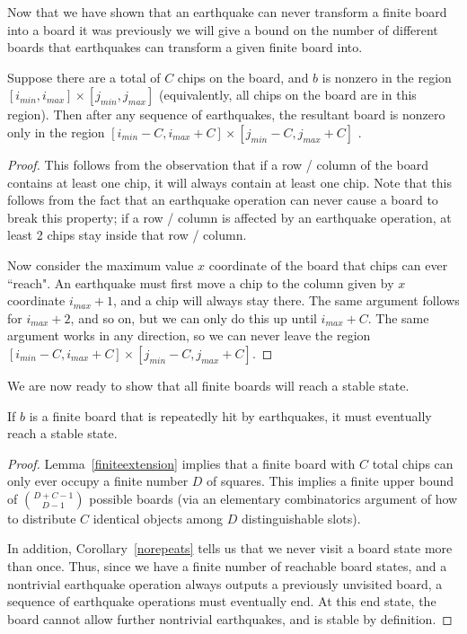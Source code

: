 \documentclass[runningheads,a4paper]{llncs}
\begin{document}
Now that we have shown that an earthquake can never transform a finite board into a board it was previously we will give a bound on the number of different boards that earthquakes can transform a given finite board into.
\begin{lemma}
\label{finiteextension}
Suppose there are a total of $C$ chips on the board, and $b$ is nonzero in the region $[i_{min}, i_{max}] \times [j_{min}, j_{max}]$ (equivalently, all chips on the board are in this region). Then after any sequence of earthquakes, the resultant board is nonzero only in the region $[i_{min}-C, i_{max}+C] \times [j_{min}-C, j_{max}+C]$ .
\end{lemma}

\begin{proof}
This follows from the observation that if a row / column of the board contains at least one chip, it will always contain at least one chip. Note that this follows from the fact that an earthquake operation can never cause a board to break this property; if a row / column is affected by an earthquake operation, at least 2 chips stay inside that row / column.

Now consider the maximum value $x$ coordinate of the board that chips can ever ``reach". An earthquake must first move a chip to the column given by $x$ coordinate $i_{max} +1$, and a chip will always stay there. The same argument follows for $i_{max} + 2$, and so on, but we can only do this up until $i_{max} +C$. The same argument works in any direction, so we can never leave the region $[i_{min}-C, i_{max}+C] \times [j_{min}-C, j_{max}+C]$.
\end{proof}

We are now ready to show that all finite boards will reach a stable state. 

\begin{theorem} If $b$ is a finite board that is repeatedly hit by earthquakes, it must eventually reach a stable state. 
\end{theorem}
\label{finitestability}
\begin{proof}
Lemma~\ref{finiteextension} implies that a finite board with $C$ total chips can only ever occupy a finite number $D$ of squares. This implies a finite upper bound of $\binom{D+C-1}{D-1}$ possible boards (via an elementary combinatorics argument of how to distribute $C$ identical objects among $D$ distinguishable slots).

In addition, Corollary~\ref{norepeats} tells us that we never visit a board state more than once. Thus, since we have a finite number of reachable board states, and a nontrivial earthquake operation always outputs a previously unvisited board, a sequence of earthquake operations must eventually end. At this end state, the board cannot allow further nontrivial earthquakes, and is stable by definition.
\end{proof}
\end{document}
